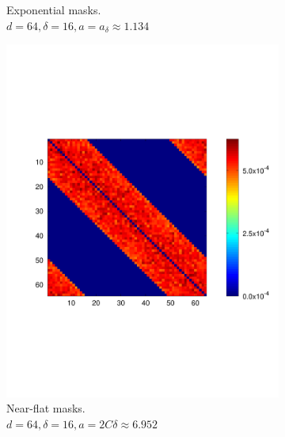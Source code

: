 \begin{figure}
\begin{subfigure}[b]{.49\textwidth}
    \caption{Exponential masks. \\ $d = 64, \delta = 16, a = a_\delta \approx 1.134$}
    \label{fig:expvar64}
  \end{subfigure}
  \begin{subfigure}[b]{.49\textwidth}
    \centering
    \includegraphics[width=\textwidth,trim={.4in 2.5in .8in 2.5in}]{figs/flatvar512}
    \caption{Near-flat masks.\\  $d = 64, \delta = 16, a = 2 C \delta \approx 6.952$}
    \label{fig:flatvar64}
  \end{subfigure}
  \begin{subfigure}[b]{.49\textwidth}
    \centering

\end{subfigure}
\end{figure}
